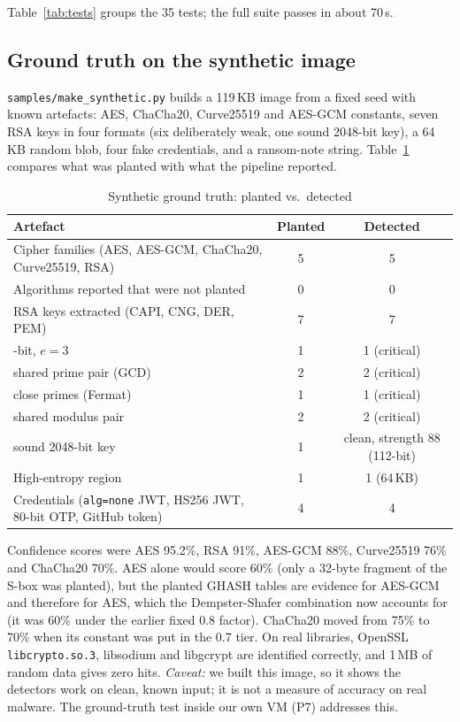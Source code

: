 Table~\ref{tab:tests} groups the 35 tests; the full suite passes in about 70\,s.

\subsection{Ground truth on the synthetic image}
\texttt{samples/make\_synthetic.py} builds a 119\,KB image from a fixed seed with known artefacts: AES,
ChaCha20, Curve25519 and AES-GCM constants, seven RSA keys in four formats (six deliberately weak, one
sound 2048-bit key), a 64\,KB random blob, four fake credentials, and a ransom-note string.
Table~\ref{tab:gt} compares what was planted with what the pipeline reported.

\begin{table}[t]
\centering
\caption{Synthetic ground truth: planted vs.\ detected}
\label{tab:gt}
\footnotesize
\begin{tabularx}{\columnwidth}{@{}Xcc@{}}
\toprule
Artefact & Planted & Detected\\
\midrule
Cipher families (AES, AES-GCM, ChaCha20, Curve25519, RSA) & 5 & 5\\
Algorithms reported that were not planted & 0 & 0\\
RSA keys extracted (CAPI, CNG, DER, PEM) & 7 & 7\\
\quad 512-bit, $e=3$ & 1 & 1 (critical)\\
\quad shared prime pair (GCD) & 2 & 2 (critical)\\
\quad close primes (Fermat) & 1 & 1 (critical)\\
\quad shared modulus pair & 2 & 2 (critical)\\
\quad sound 2048-bit key & 1 & clean, strength 88 (112-bit)\\
High-entropy region & 1 & 1 (64\,KB)\\
Credentials (\texttt{alg=none} JWT, HS256 JWT, 80-bit OTP, GitHub token) & 4 & 4\\
\bottomrule
\end{tabularx}
\end{table}

Confidence scores were AES 95.2\%, RSA 91\%, AES-GCM 88\%, Curve25519 76\% and ChaCha20 70\%. AES alone
would score 60\% (only a 32-byte fragment of the S-box was planted), but the planted GHASH tables are
evidence for AES-GCM and therefore for AES, which the Dempster-Shafer combination now accounts for (it was
60\% under the earlier fixed 0.8 factor). ChaCha20 moved from 75\% to 70\% when its constant was put in the
0.7 tier. On real libraries, OpenSSL \texttt{libcrypto.so.3}, libsodium and libgcrypt are identified
correctly, and 1\,MB of random data gives zero hits.
\emph{Caveat:} we built this image, so it shows the detectors work on clean, known input; it is not a
measure of accuracy on real malware. The ground-truth test inside our own VM (P7) addresses this.

